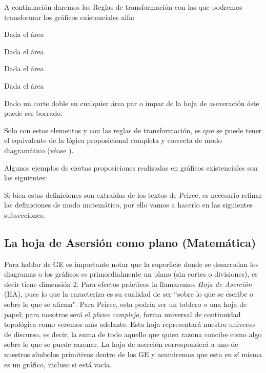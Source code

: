 \documentclass[
	fontsize=10pt, %
	twoside=false, %
	secnumdepth=1, %
	abstract=true, %
]{kaohandt}
\begin{document}
A continuación daremos las Reglas de transformación con las que podremos transformar los gráficos existenciales alfa:

\begin{definition}
	Dada el área
\end{definition}

\begin{definition}
	Dada el área
\end{definition}

\begin{definition}
	Dada el área
\end{definition}

\begin{definition}
	Dada el área
\end{definition}

\begin{definition}
	Dado un corte doble en cualquier área par o impar de la hoja de aseveración éste puede ser borrado.
\end{definition}

Solo con estos elementos y con las reglas de transformación, es que se puede tener el equivalente de la lógica proposicional completa y correcta de modo diagramático (véase ).

Algunos ejemplos de ciertas proposiciones realizadas en gráficos existenciales son las siguientes:



Si bien estas definiciones son extraídas de los textos de Peirce, es necesario refinar las definiciones de modo matemático, por ello vamos a hacerlo en las siguientes subsecciones.
\subsection{La hoja de Asersión como plano (Matemática)}

Para hablar de GE es importante notar que la superficie donde se desarrollan los diagramas o los gráficos es primordialmente un plano (sin cortes o divisiones), es decir tiene dimensión 2. Para efectos prácticos la llamaremos \textit{Hoja de Aserción} (HA), pues lo que la caracteriza es su cualidad de ser ``sobre lo que se escribe o sobre lo que se afirma". Para Peirce, esta podría ser un tablero o una hoja de papel; para nosotros será el \emph{plano complejo}, forma universal de continuidad topológica como veremos más adelante. Esta hoja representará nuestro universo de discurso, es decir, la suma de todo aquello que quien razona concibe como algo sobre lo que se puede razonar. La hoja de aserción corresponderá a uno de nuestros símbolos primitivos dentro de los GE y asumiremos que esta en sí misma es un gráfico, incluso si está vacía. 
\end{document}
